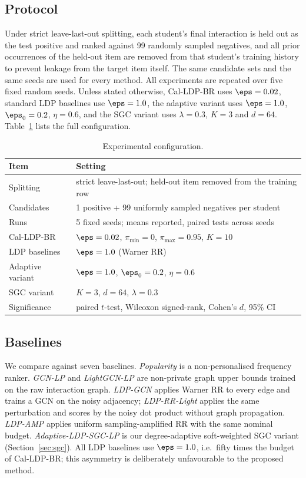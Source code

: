 \subsection{Protocol}\label{sec:protocol}

Under strict leave-last-out splitting, each student's final interaction is held out as the test positive and ranked against 99 randomly sampled negatives, and all prior occurrences of the held-out item are removed from that student's training history to prevent leakage from the target item itself. The same candidate sets and the same seeds are used for every method. All experiments are repeated over five fixed random seeds. Unless stated otherwise, Cal-LDP-BR uses $\eps=0.02$, standard LDP baselines use $\eps=1.0$, the adaptive variant uses $\eps=1.0$, $\eps_0=0.2$, $\eta=0.6$, and the SGC variant uses $\lambda=0.3$, $K=3$ and $d=64$. Table~\ref{tab:protocol} lists the full configuration.

\begin{table}[t]
\caption{Experimental configuration.}
\label{tab:protocol}
\small
\begin{tabular}{@{}ll@{}}
\toprule
Item & Setting \\
\midrule
Splitting & strict leave-last-out; held-out item removed from the training row \\
Candidates & 1 positive + 99 uniformly sampled negatives per student \\
Runs & 5 fixed seeds; means reported, paired tests across seeds \\
Cal-LDP-BR & $\eps=0.02$, $\pi_{\min}=0$, $\pi_{\max}=0.95$, $K=10$ \\
LDP baselines & $\eps=1.0$ (Warner RR) \\
Adaptive variant & $\eps=1.0$, $\eps_0=0.2$, $\eta=0.6$ \\
SGC variant & $K=3$, $d=64$, $\lambda=0.3$ \\
Significance & paired $t$-test, Wilcoxon signed-rank, Cohen's $d$, 95\% CI \\
\bottomrule
\end{tabular}
\end{table}

\subsection{Baselines}

We compare against seven baselines. \emph{Popularity} is a non-personalised frequency ranker. \emph{GCN-LP} \cite{kipf2017gcn} and \emph{LightGCN-LP} \cite{he2020lightgcn} are non-private graph upper bounds trained on the raw interaction graph. \emph{LDP-GCN} applies Warner RR to every edge and trains a GCN on the noisy adjacency; \emph{LDP-RR-Light} applies the same perturbation and scores by the noisy dot product without graph propagation. \emph{LDP-AMP} applies uniform sampling-amplified RR with the same nominal budget. \emph{Adaptive-LDP-SGC-LP} is our degree-adaptive soft-weighted SGC variant (Section~\ref{sec:sgc}). All LDP baselines use $\eps=1.0$, i.e.\ fifty times the budget of Cal-LDP-BR; this asymmetry is deliberately unfavourable to the proposed method.


